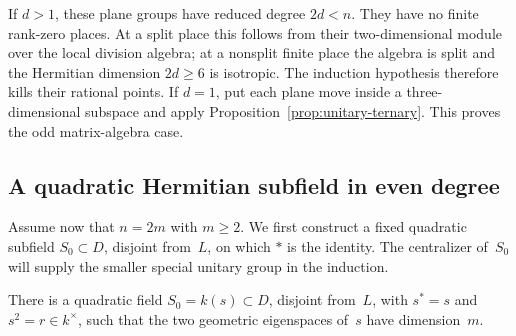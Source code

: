 If $d>1$, these plane groups have reduced degree $2d<n$.  They have no
finite rank-zero places.  At a split place this follows from their
two-dimensional module over the local division algebra; at a
nonsplit finite place the algebra is split and the Hermitian
dimension $2d\geq6$ is isotropic.  The induction hypothesis therefore
kills their rational points.  If $d=1$, put each plane move inside a
three-dimensional subspace and apply
Proposition~\ref{prop:unitary-ternary}.  This proves the odd
matrix-algebra case.

\subsection{A quadratic Hermitian subfield in even degree}

Assume now that $n=2m$ with $m\geq2$.  We first construct a fixed
quadratic subfield $S_0\subset D$, disjoint from~$L$, on which $*$ is
the identity.  The centralizer of~$S_0$ will supply the smaller special
unitary group in the induction.

\begin{lemma}\label{lem:unitary-hermitian-quadratic}
There is a quadratic field $S_0=k(s)\subset D$, disjoint from~$L$,
with $s^*=s$ and $s^2=r\in k^\times$, such that the two geometric
eigenspaces of~$s$ have dimension~$m$.
\end{lemma}

